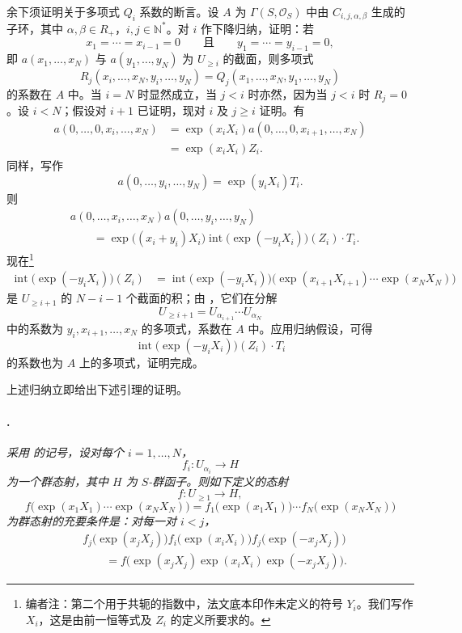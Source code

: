 余下须证明关于多项式 \(Q_i\) 系数的断言。设 \(A\) 为 \(\Gamma(S,\mathcal O_S)\) 中由 \(C_{i,j,\alpha,\beta}\) 生成的子环，其中 \(\alpha,\beta\in R_+\)，\(i,j\in\mathbb N^*\)。对 \(i\) 作下降归纳，证明：若
\[
  x_1=\cdots=x_{i-1}=0
  \qquad\text{且}\qquad
  y_1=\cdots=y_{i-1}=0,
\]
即 \(a(x_1,\ldots,x_N)\) 与 \(a(y_1,\ldots,y_N)\) 为 \(U_{\geq i}\) 的截面，则多项式
\[
  R_j(x_i,\ldots,x_N,y_i,\ldots,y_N)
  =
  Q_j(x_1,\ldots,x_N,y_1,\ldots,y_N)
\]
的系数在 \(A\) 中。当 \(i=N\) 时显然成立，当 \(j<i\) 时亦然，因为当 \(j<i\) 时 \(R_j=0\)。设 \(i<N\)；假设对 \(i+1\) 已证明，现对 \(i\) 及 \(j\geq i\) 证明。有
\[
\begin{split}
  a(0,\ldots,0,x_i,\ldots,x_N)
  &=
  \exp(x_iX_i)
  a(0,\ldots,0,x_{i+1},\ldots,x_N)\\
  &=
  \exp(x_iX_i)Z_i.
\end{split}
\]
同样，写作
\[
  a(0,\ldots,y_i,\ldots,y_N)=\exp(y_iX_i)T_i.
\]
则
\[
\begin{split}
  &a(0,\ldots,x_i,\ldots,x_N)
   a(0,\ldots,y_i,\ldots,y_N)\\
  &\qquad =
  \exp\bigl((x_i+y_i)X_i\bigr)
  \operatorname{int}\bigl(\exp(-y_iX_i)\bigr)(Z_i)\cdot T_i.
\end{split}
\]
现在\footnote{编者注：第二个用于共轭的指数中，法文底本印作未定义的符号 \(Y_i\)。我们写作 \(X_i\)，这是由前一恒等式及 \(Z_i\) 的定义所要求的。}
\[
\begin{split}
  \operatorname{int}\bigl(\exp(-y_iX_i)\bigr)(Z_i)
  &=
  \operatorname{int}\bigl(\exp(-y_iX_i)\bigr)
  \bigl(
    \exp(x_{i+1}X_{i+1})\cdots\exp(x_NX_N)
  \bigr)
\end{split}
\]
是 \(U_{\geq i+1}\) 的 \(N-i-1\) 个截面的积；由 ，它们在分解
\[
  U_{\geq i+1}
  =
  U_{\alpha_{i+1}}\cdots U_{\alpha_N}
\]
中的系数为 \(y_i,x_{i+1},\ldots,x_N\) 的多项式，系数在 \(A\) 中。应用归纳假设，可得
\[
  \operatorname{int}\bigl(\exp(-y_iX_i)\bigr)(Z_i)\cdot T_i
\]
的系数也为 \(A\) 上的多项式，证明完成。

上述归纳立即给出下述引理的证明。

\paragraph{.}
\textit{采用  的记号，设对每个 \(i=1,\ldots,N\)，}
\[
  f_i:U_{\alpha_i}\longrightarrow H
\]
\textit{为一个群态射，其中 \(H\) 为 \(S\)-群函子。则如下定义的态射}
\[
  f:U_{\geq1}\longrightarrow H,
\]
\[
  f\bigl(
    \exp(x_1X_1)\cdots\exp(x_NX_N)
  \bigr)
  =
  f_1\bigl(\exp(x_1X_1)\bigr)\cdots
  f_N\bigl(\exp(x_NX_N)\bigr)
\]
\textit{为群态射的充要条件是：对每一对 \(i<j\)，}
\[
\begin{split}
  &f_j\bigl(\exp(x_jX_j)\bigr)
   f_i\bigl(\exp(x_iX_i)\bigr)
   f_j\bigl(\exp(-x_jX_j)\bigr)\\
  &\qquad =
  f\bigl(
    \exp(x_jX_j)\exp(x_iX_i)\exp(-x_jX_j)
  \bigr).
\end{split}
\]
